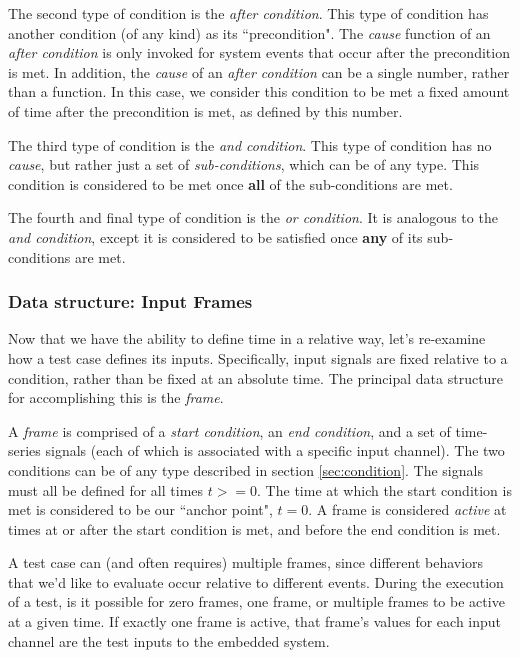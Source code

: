 \documentclass[12pt]{article}
\begin{document}
The second type of condition is the \textit{after condition}.  This type of condition has another condition (of any kind) as its ``precondition".  The \textit{cause} function of an \textit{after condition} is only invoked for system events that occur after the precondition is met.   In addition, the \textit{cause} of an \textit{after condition} can be a single number, rather than a function.  In this case, we consider this condition to be met a fixed amount of time after the precondition is met, as defined by this number.

The third type of condition is the \textit{and condition}.  This type of condition has no \textit{cause}, but rather just a set of \textit{sub-conditions}, which can be of any type.  This condition is considered to be met once \textbf{all} of the sub-conditions are met.

The fourth and final type of condition is the \textit{or condition}.  It is analogous to the \textit{and condition}, except it is considered to be satisfied once \textbf{any} of its sub-conditions are met.

\subsubsection{Data structure: Input Frames}
\label{sec:frames}
Now that we have the ability to define time in a relative way, let's re-examine how a test case defines its inputs.  Specifically, input signals are fixed relative to a condition, rather than be fixed at an absolute time.  The principal data structure for accomplishing this is the \textit{frame}.

A \textit{frame} is comprised of a \textit{start condition}, an \textit{end condition}, and a set of time-series signals (each of which is associated with a specific input channel).  The two conditions can be of any type described in section \ref{sec:condition}.  The signals must all be defined for all times $t>=0$.  The time at which the start condition is met is considered to be our ``anchor point", $t=0$.  A frame is considered \textit{active} at times at or after the start condition is met, and before the end condition is met.

A test case can (and often requires) multiple frames, since different behaviors that we'd like to evaluate occur relative to different events.  During the execution of a test, is it possible for zero frames, one frame, or multiple frames to be active at a given time.  If exactly one frame is active, that frame's values for each input channel are the test inputs to the embedded system.
\end{document}

